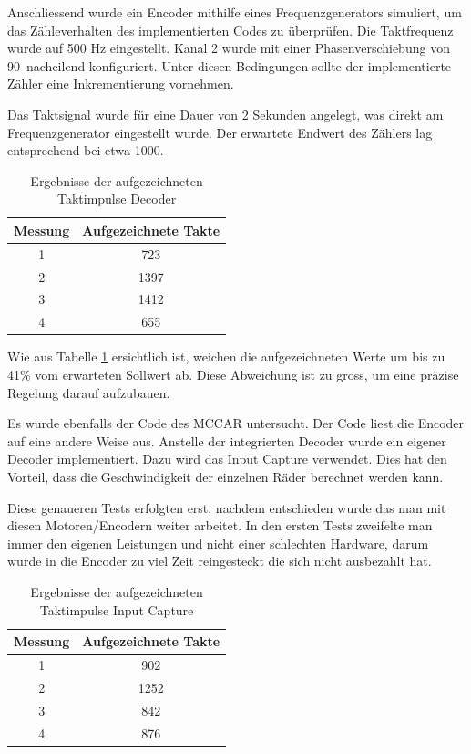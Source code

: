 Anschliessend wurde ein Encoder mithilfe eines Frequenzgenerators simuliert, um das Zähleverhalten des implementierten Codes zu überprüfen. Die Taktfrequenz wurde auf 500 Hz eingestellt. Kanal 2 wurde mit einer Phasenverschiebung von 90\textdegree \ nacheilend konfiguriert. Unter diesen Bedingungen sollte der implementierte Zähler eine Inkrementierung vornehmen.

Das Taktsignal wurde für eine Dauer von 2 Sekunden angelegt, was direkt am Frequenzgenerator eingestellt wurde. Der erwartete Endwert des Zählers lag entsprechend bei etwa 1000.

\begin{table}[H]
\centering
\caption{Ergebnisse der aufgezeichneten Taktimpulse Decoder}
\label{tab:taktergebnisse_de}
\begin{tabular}{|c|c|}
\hline
\textbf{Messung} & \textbf{Aufgezeichnete Takte} \\
\hline
1 & 723 \\
2 & 1397 \\
3 & 1412 \\
4 & 655 \\
\hline
\end{tabular}
\end{table}

Wie aus Tabelle \ref{tab:taktergebnisse_de} ersichtlich ist, weichen die aufgezeichneten Werte um bis zu 41\% vom erwarteten Sollwert ab. Diese Abweichung ist zu gross, um eine präzise Regelung darauf aufzubauen.

Es wurde ebenfalls der Code des MCCAR untersucht. Der Code liest die Encoder auf eine andere Weise aus. Anstelle der integrierten Decoder wurde ein eigener Decoder implementiert. Dazu wird das Input Capture verwendet. Dies hat den Vorteil, dass die Geschwindigkeit der einzelnen Räder berechnet werden kann.

Diese genaueren Tests erfolgten erst, nachdem entschieden wurde das man mit diesen Motoren/Encodern weiter arbeitet. In den ersten Tests zweifelte man immer den eigenen Leistungen und nicht einer schlechten Hardware, darum wurde in die Encoder zu viel Zeit reingesteckt die sich nicht ausbezahlt hat.

\begin{table}[H]
\centering
\caption{Ergebnisse der aufgezeichneten Taktimpulse Input Capture}
\label{tab:taktergebnisse_im}
\begin{tabular}{|c|c|}
\hline
\textbf{Messung} & \textbf{Aufgezeichnete Takte} \\
\hline
1 & 902 \\
2 & 1252 \\
3 & 842 \\
4 & 876 \\
\hline
\end{tabular}
\end{table}

